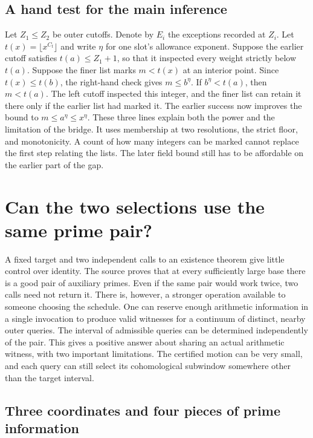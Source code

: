 \documentclass[12pt,letterpaper]{article}
\begin{document}
\subsection{A hand test for the main inference}
Let \(Z_1\le Z_2\) be outer cutoffs. Denote by \(E_i\) the exceptions recorded at \(Z_i\). Let \(t(x)=\lfloor x^{C_t}\rfloor\) and write \(\eta\) for one slot's allowance exponent. Suppose the earlier cutoff satisfies \(t(a)\le Z_1+1\), so that it inspected every weight strictly below \(t(a)\). Suppose the finer list marks \(m<t(x)\) at an interior point. Since \(t(x)\le t(b)\), the right-hand check gives \(m\le b^\eta\). If \(b^\eta<t(a)\), then \(m<t(a)\). The left cutoff inspected this integer, and the finer list can retain it there only if the earlier list had marked it. The earlier success now improves the bound to \(m\le a^\eta\le x^\eta\). These three lines explain both the power and the limitation of the bridge. It uses membership at two resolutions, the strict floor, and monotonicity. A count of how many integers can be marked cannot replace the first step relating the lists. The later field bound still has to be affordable on the earlier part of the gap.


\section{Can the two selections use the same prime pair?}
\label{sec:gap-pairs}

A fixed target and two independent calls to an existence theorem give little control over identity. The source proves that at every sufficiently large base there is a good pair of auxiliary primes. Even if the same pair would work twice, two calls need not return it. There is, however, a stronger operation available to someone choosing the schedule. One can reserve enough arithmetic information in a single invocation to produce valid witnesses for a continuum of distinct, nearby outer queries. The interval of admissible queries can be determined independently of the pair. This gives a positive answer about sharing an actual arithmetic witness, with two important limitations. The certified motion can be very small, and each query can still select its cohomological subwindow somewhere other than the target interval.

\subsection{Three coordinates and four pieces of prime information}
\end{document}
